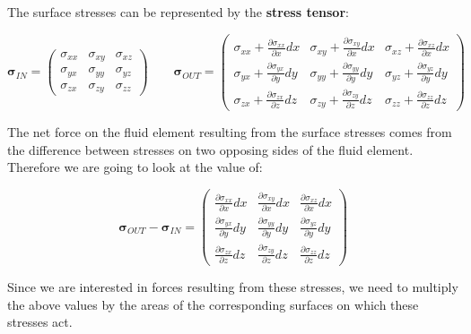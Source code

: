 The surface stresses can be represented by the \textbf{stress tensor}:

\begin{equation}
\bm{\sigma}_{IN} = \left(
\begin{matrix} 
\sigma_{xx} & \sigma_{xy} & \sigma_{xz} \\
\sigma_{yx} & \sigma_{yy} & \sigma_{yz} \\
\sigma_{zx} & \sigma_{zy} & \sigma_{zz}
\end{matrix}
\right)
\,\,\,\,\,\,\,\,\,\,\,\,
\bm{\sigma}_{OUT} = \left(
\begin{matrix} 
\sigma_{xx} + \frac{\partial \sigma_{xx}}{\partial x}dx & \sigma_{xy} + \frac{\partial \sigma_{xy}}{\partial x}dx & \sigma_{xz} + \frac{\partial \sigma_{xz}}{\partial x}dx \\
\sigma_{yx} + \frac{\partial \sigma_{yx}}{\partial y}dy & \sigma_{yy} + \frac{\partial \sigma_{yy}}{\partial y}dy & \sigma_{yz} + \frac{\partial \sigma_{yz}}{\partial y}dy \\
\sigma_{zx} + \frac{\partial \sigma_{zx}}{\partial z}dz & \sigma_{zy} + \frac{\partial \sigma_{zy}}{\partial z}dz & \sigma_{zz} + \frac{\partial \sigma_{zz}}{\partial z}dz 
\end{matrix}
\right)
\end{equation}

The net force on the fluid element resulting from the surface stresses comes from the difference between stresses on two opposing sides of the fluid element. Therefore we are going to look at the value of:

\begin{equation}
\bm{\sigma}_{OUT} - \bm{\sigma}_{IN} = \left(
\begin{matrix} 
 \frac{\partial \sigma_{xx}}{\partial x}dx & \frac{\partial \sigma_{xy}}{\partial x}dx & \frac{\partial \sigma_{xz}}{\partial x}dx \\
\frac{\partial \sigma_{yx}}{\partial y}dy & \frac{\partial \sigma_{yy}}{\partial y}dy & \frac{\partial \sigma_{yz}}{\partial y}dy \\
\frac{\partial \sigma_{zx}}{\partial z}dz & \frac{\partial \sigma_{zy}}{\partial z}dz & \frac{\partial \sigma_{zz}}{\partial z}dz 
\end{matrix}
\right)
\end{equation}

Since we are interested in forces resulting from these stresses, we need to multiply the above values by the areas of the corresponding surfaces on which these stresses act.

